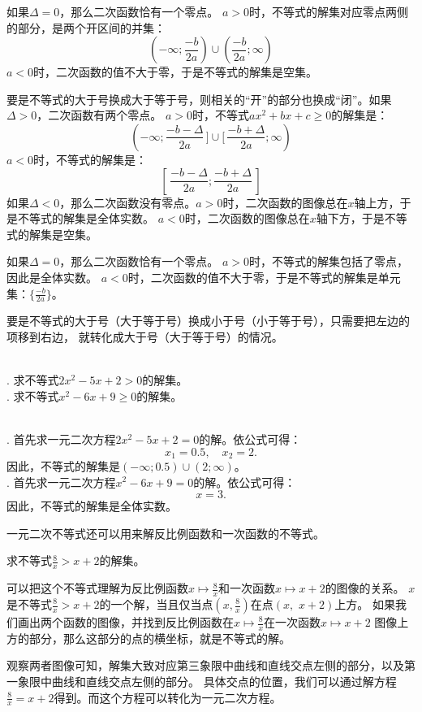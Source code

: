 \documentclass[12pt,UTF8]{ctexbook}
\begin{document}
如果$\Delta = 0$，那么二次函数恰有一个零点。
$a>0$时，不等式的解集对应零点两侧的部分，是两个开区间的并集：
$$ (-\infty; \frac{-b}{2a}) \cup (\frac{-b}{2a}; \infty)$$
$a<0$时，二次函数的值不大于零，于是不等式的解集是空集。

要是不等式的大于号换成大于等于号，则相关的“开”的部分也换成“闭”。如果$\Delta>0$，二次函数有两个零点。
$a>0$时，不等式$ax^2 + bx + c \geqslant 0$的解集是：
$$ (-\infty; \frac{-b - \Delta}{2a}\,] \cup [\,\frac{-b +\Delta}{2a}; \infty)$$
$a<0$时，不等式的解集是：
$$ [\,\frac{-b - \Delta}{2a}; \frac{-b +\Delta}{2a}\,] $$
如果$\Delta<0$，那么二次函数没有零点。$a>0$时，二次函数的图像总在$x$轴上方，于是不等式的解集是全体实数。
$a<0$时，二次函数的图像总在$x$轴下方，于是不等式的解集是空集。

如果$\Delta = 0$，那么二次函数恰有一个零点。
$a>0$时，不等式的解集包括了零点，因此是全体实数。
$a<0$时，二次函数的值不大于零，于是不等式的解集是单元集：$\{\frac{-b}{2a}\}$。

要是不等式的大于号（大于等于号）换成小于号（小于等于号），只需要把左边的项移到右边，
就转化成大于号（大于等于号）的情况。

\begin{ex}
    \mbox{}\\
    . 求不等式$2x^2 - 5x + 2 > 0$的解集。\\
    . 求不等式$x^2 - 6x + 9 \geqslant 0$的解集。
\end{ex}
\begin{so}
    \mbox{}\\
    . 首先求一元二次方程$2x^2 - 5x + 2 = 0$的解。依公式可得：
    $$ x_1 = 0.5, \quad x_2 = 2.$$
    因此，不等式的解集是$(-\infty; 0.5) \cup (2; \infty)$。\\
    . 首先求一元二次方程$x^2 - 6x + 9 = 0$的解。依公式可得：
    $$ x = 3.$$
    因此，不等式的解集是全体实数。
\end{so}

一元二次不等式还可以用来解反比例函数和一次函数的不等式。
\begin{ex}
    求不等式$\frac{8}{x} > x + 2$的解集。
\end{ex}
可以把这个不等式理解为反比例函数$x \mapsto \frac{8}{x}$和一次函数$x \mapsto x + 2$的图像的关系。
$x$是不等式$\frac{8}{x} > x + 2$的一个解，当且仅当点$(x, \frac{8}{x})$在点$(x, \,\,x + 2)$上方。
如果我们画出两个函数的图像，并找到反比例函数在$x \mapsto \frac{8}{x}$在一次函数$x \mapsto x + 2$
图像上方的部分，那么这部分的点的横坐标，就是不等式的解。

观察两者图像可知，解集大致对应第三象限中曲线和直线交点左侧的部分，以及第一象限中曲线和直线交点左侧的部分。
具体交点的位置，我们可以通过解方程$\frac{8}{x} = x + 2$得到。而这个方程可以转化为一元二次方程。
\end{document}
